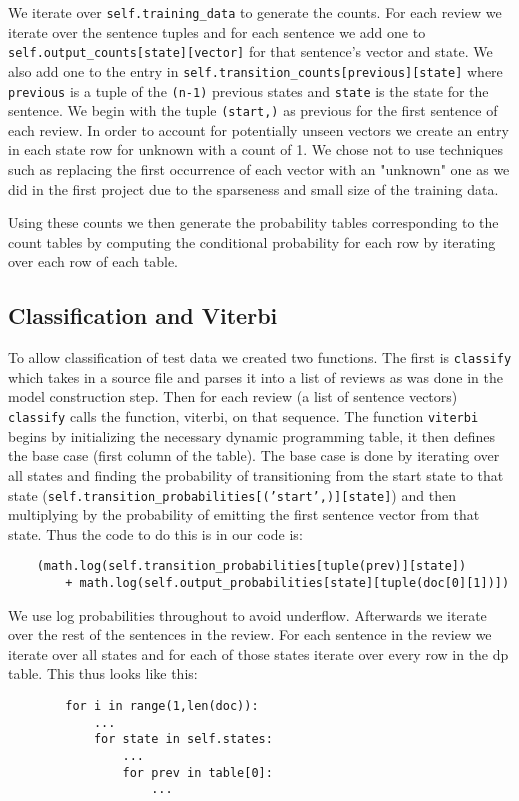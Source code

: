 \documentclass{article}
\begin{document}
We iterate over \texttt{self.training\_data} to generate the counts. For each review we iterate over the sentence tuples and for each sentence we add one to \texttt{self.output\_counts[state][vector]} for that sentence's vector and state. We also add one to the entry in  \texttt{self.transition\_counts[previous][state]} where \texttt{previous} is a tuple of the \texttt{(n-1)} previous states and \texttt{state} is the state for the sentence. We begin with the tuple \texttt{(start,)} as previous for the first sentence of each review. In order to account for potentially unseen vectors we create an entry in each state row for unknown with a count of 1. We chose not to use techniques such as replacing the first occurrence of each vector with an "unknown" one as we did in the first project due to the sparseness and small size of the training data. 

Using these counts we then generate the probability tables corresponding to the count tables by computing the conditional probability for each row by iterating over each row of each table.
 
\subsection{Classification and Viterbi}

To allow classification of test data we created two functions. The first is \texttt{classify} which takes in a source file and parses it into a list of reviews as was done in the model construction step. Then for each review (a list of sentence vectors) \texttt{classify} calls the function, viterbi, on that sequence. The function \texttt{viterbi} begins by initializing the necessary dynamic programming table, it then defines the base case (first column of the table). The base case is done by iterating over all states and finding the probability of transitioning from the start state to that state (\texttt{self.transition\_probabilities[('start',)][state]}) and then multiplying by the probability of emitting the first sentence vector from that state. Thus the code to do this is in our code is:
\begin{verbatim}
    (math.log(self.transition_probabilities[tuple(prev)][state])
        + math.log(self.output_probabilities[state][tuple(doc[0][1])])
\end{verbatim}

We use log probabilities throughout to avoid underflow. Afterwards we iterate over the rest of the sentences in the review. For each sentence in the review we iterate over all states and for each of those states iterate over every row in the dp table. This thus looks like this:
\begin{verbatim}
        for i in range(1,len(doc)):
            ...
            for state in self.states:
                ...
                for prev in table[0]:
                    ...
\end{verbatim}
\end{document}
